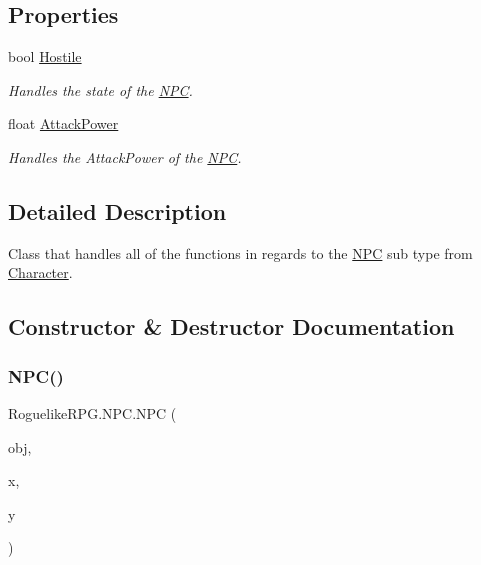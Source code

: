 \subsection*{Properties}
\begin{DoxyCompactItemize}
\item 
bool \mbox{\hyperlink{class_roguelike_r_p_g_1_1_n_p_c_a0573eb51eeafa976f5f4366ea1b14892}{Hostile}}
\begin{DoxyCompactList}\small\item\em Handles the state of the \mbox{\hyperlink{class_roguelike_r_p_g_1_1_n_p_c}{N\+PC}}. \end{DoxyCompactList}\item 
float \mbox{\hyperlink{class_roguelike_r_p_g_1_1_n_p_c_a9cac8d5f5a1450aa17ff7739c109e7b8}{Attack\+Power}}
\begin{DoxyCompactList}\small\item\em Handles the Attack\+Power of the \mbox{\hyperlink{class_roguelike_r_p_g_1_1_n_p_c}{N\+PC}}. \end{DoxyCompactList}\end{DoxyCompactItemize}


\subsection{Detailed Description}
Class that handles all of the functions in regards to the \mbox{\hyperlink{class_roguelike_r_p_g_1_1_n_p_c}{N\+PC}} sub type from \mbox{\hyperlink{class_roguelike_r_p_g_1_1_character}{Character}}. 



\subsection{Constructor \& Destructor Documentation}
\mbox{\label{class_roguelike_r_p_g_1_1_n_p_c_a2df0707bbdfb1078c414b87a1dd4cf5c}} 
\subsubsection{\texorpdfstring{N\+P\+C()}{NPC()}}
{\footnotesize\ttfamily Roguelike\+R\+P\+G.\+N\+P\+C.\+N\+PC (\begin{DoxyParamCaption}\item[{\mbox{\hyperlink{struct_roguelike_r_p_g_1_1_object_data}{Object\+Data}}}]{obj,  }\item[{int}]{x,  }\item[{int}]{y }\end{DoxyParamCaption})\hspace{0.3cm}{\ttfamily [inline]}}



